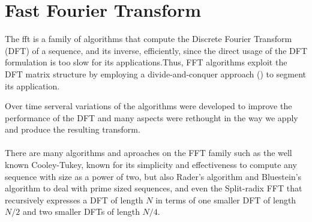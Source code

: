 \documentclass[
  oneside,
  11pt, a4paper,
  footinclude=true,
  headinclude=true,
  cleardoublepage=empty
]{scrbook}
\begin{document}
\section{Fast Fourier Transform} \label{sec:fast-fourier-transform}

The \acrfull{fft} is a family of algorithms that compute the Discrete Fourier Transform (DFT) of a sequence, and its inverse, efficiently, since the direct usage of the DFT formulation is too slow for its applications.Thus, FFT algorithms exploit the DFT matrix structure by employing a divide-and-conquer approach (\cite{chu1999inside}) to segment its application.

Over time serveral variations of the algorithms were developed to improve the performance of the DFT and many aspects were rethought in the way we apply and produce the resulting transform.



\paragraph{}
There are many algorithms and aproaches on the FFT family such as the well known Cooley-Tukey, known for its simplicity and effectiveness to compute any sequence with size as a power of two, but also Rader's algorithm \cite{rader1968discrete} and Bluestein's algorithm \cite{bluestein1970linear} to deal with prime sized sequences, and even the Split-radix FFT \cite{yavne1968economical} that recursively expresses a DFT of length \(N\) in terms of one smaller DFT of length \(N/2\) and two smaller DFTs of length \(N/4\). 
\end{document}
